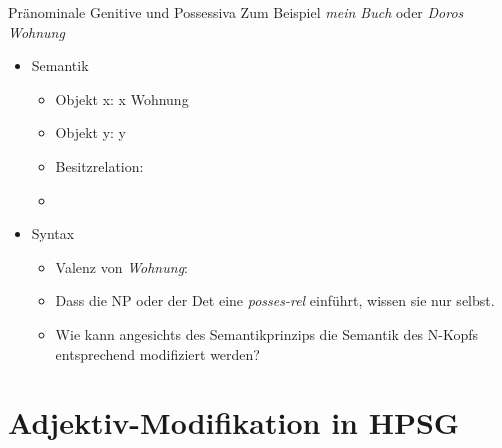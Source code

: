 \begin{frame}
  {Pränominale Genitive und Possessiva}
  \onslide<+->
  \onslide<+->
  Zum Beispiel \alert{\textit{mein Buch}} oder \alert{\textit{Doros Wohnung}}\\
  \Halbzeile
  \begin{itemize}[<+->]
    \item Semantik
      \Viertelzeile
      \begin{itemize}[<+->]
        \item Objekt x: x  Wohnung
        \item Objekt y: y 
        \item Besitzrelation: 
        \item %
      \end{itemize}
      \Halbzeile
    \item Syntax
      \begin{itemize}[<+->]
        \item Valenz von \textit{Wohnung}: %
        \item Dass die NP oder der Det eine \textit{posses-rel} einführt, wissen sie nur selbst.
        \item Wie kann angesichts des \alert{Semantikprinzips} die Semantik des N-Kopfs\\
          entsprechend modifiziert werden?
      \end{itemize}
  \end{itemize}
\end{frame}


\section{Adjektiv-Modifikation in HPSG}

